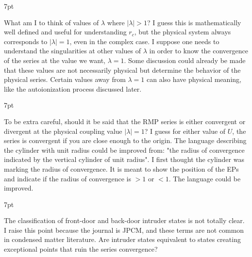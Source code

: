 \documentclass[10pt]{letter}
\newenvironment{formal}{%
  \def\FrameCommand{%
    \hspace{1pt}%
    {\color{darkblue}\vrule width 2pt}%
    {\color{formalshade}\vrule width 4pt}%
    \colorbox{formalshade}%
  }%
  \MakeFramed{\advance\hsize-\width\FrameRestore}%
  \noindent\hspace{-4.55pt}%
  \begin{adjustwidth}{}{7pt}%
  \vspace{2pt}\vspace{2pt}%
}
{%
  \vspace{2pt}\end{adjustwidth}\endMakeFramed%
}
\begin{document}
\begin{letter}

\begin{formal}
What am I to think of values of $\lambda$ where $|\lambda|>1$? 
I guess this is mathematically well defined and useful for understanding $r_c$, but the physical system always corresponds to $|\lambda|=1$, even in the complex case. 
I suppose one needs to understand the singularities at other values of $\lambda$ in order to know the convergence of the series at the value we want, $\lambda = 1$.
Some discussion could already be made that these values are not necessarily physical but determine the behavior of the physical series. 
Certain values away from $\lambda=1$ can also have physical meaning, like the autoionization process discussed later.
\end{formal}


\begin{formal}
To be extra careful, should it be said that the RMP series is either convergent or divergent at the physical coupling value $|\lambda|=1$? 
I guess for either value of $U$, the series is convergent if you are close enough to the origin.
The language describing the cylinder with unit radius could be improved from: "the radius of convergence indicated by the vertical cylinder of unit radius".
I first thought the cylinder was marking the radius of convergence. It is meant to show the position of the EPs and indicate if the radius of convergence is $>1$ or $<1$. 
The language could be improved.
\end{formal}


\begin{formal}
The classification of front-door and back-door intruder states is not totally clear. 
I raise this point because the journal is JPCM, and these terms are not common in condensed matter literature. 
Are intruder states equivalent to states creating exceptional points that ruin the series convergence?
\end{formal}


\end{letter}
\end{document}
